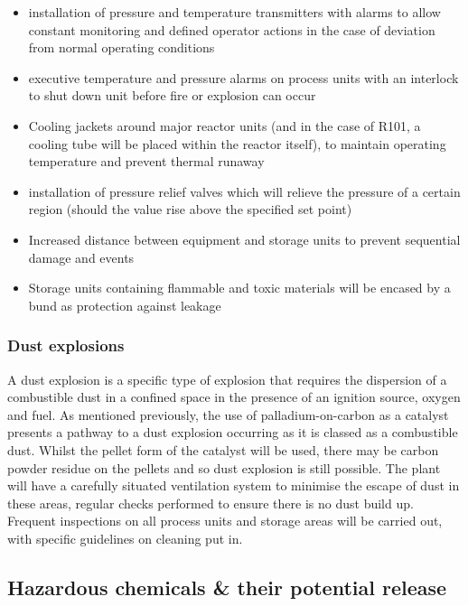 \begin{itemize}
\item installation of pressure and temperature transmitters with alarms to allow constant monitoring and defined operator actions in the case of deviation from normal operating conditions
         \item executive temperature and pressure alarms on process units with an interlock to shut down unit before fire or explosion can occur 
         \item Cooling jackets around major reactor units (and in the case of R101, a cooling tube will be placed within the reactor itself), to maintain operating temperature and prevent thermal runaway 
          \item installation of pressure relief valves which will relieve the pressure of a certain region (should the value rise above the specified set point)
    \item Increased distance between equipment and storage units to prevent sequential damage and events
    \item Storage units containing flammable and toxic materials will be encased by a bund as protection against leakage
\end{itemize}


\subsubsection{Dust explosions}

A dust explosion is a specific type of explosion that requires the dispersion of a combustible dust in a confined space in the presence of an ignition source, oxygen and fuel. As mentioned previously, the use of palladium-on-carbon as a catalyst presents a pathway to a dust explosion occurring as it is classed as a combustible dust. Whilst the pellet form of the catalyst will be used, there may be carbon powder residue on the pellets and so dust explosion is still possible. The plant will have a carefully situated ventilation system to minimise the escape of dust in these areas, regular checks performed to ensure there is no dust build up.
Frequent inspections on all process units and storage areas will be carried out, with specific guidelines on cleaning put in. 

\subsection{Hazardous chemicals \& their potential release}

